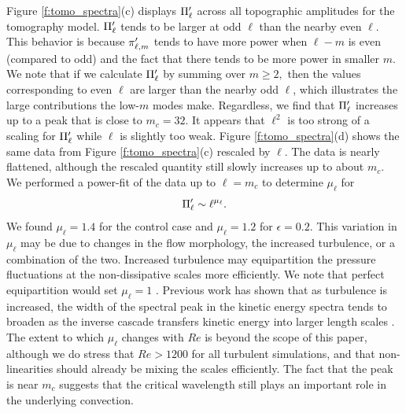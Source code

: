  Figure \ref{f:tomo_spectra}(c) displays $\Pi^{\prime}_{\ell}$ across all topographic amplitudes for the tomography model. $\Pi^{\prime}_{\ell}$ tends to be larger at odd $\ell$ than the nearby even $\ell$. This behavior is because $\pi^{\prime}_{\ell,m}$ tends to have more power when $\ell - m$ is even (compared to odd) and the fact that there tends to be more power in smaller $m$. 
We note that if we calculate  $\Pi^{\prime}_{\ell}$ by summing over $m\geq2,$ then the values corresponding to even $\ell$ are larger than the nearby odd $\ell$, which illustrates the large contributions the low-$m$ modes make. 
 Regardless, we find that $\Pi^{\prime}_{\ell}$ increases up to a peak that is close to $m_{c}=32$. It appears that  $\ell^{2}$ is too strong of a scaling for $\Pi^{\prime}_{\ell}$ while $\ell$ is slightly too weak. Figure \ref{f:tomo_spectra}(d) shows the same data from Figure \ref{f:tomo_spectra}(c) rescaled by $\ell.$ The data is nearly flattened, although the rescaled quantity still slowly increases up to about $m_{c}$. We performed a power-fit of the data up to $\ell = m_{c}$ to determine $\mu_{\ell}$ for
 \[\Pi^{\prime}_{\ell}\sim \ell^{\mu_{\ell}}.\]  
 We found $\mu_\ell={1.4}$ for the control case and $\mu_\ell={1.2}$ for $\epsilon  = 0.2.$
 This variation in $\mu_{\ell}$ may be due to changes in the flow morphology, the increased turbulence, or a combination of the two. Increased turbulence may equipartition the pressure fluctuations at the non-dissipative scales more efficiently. We note that perfect equipartition would set $\mu_{\ell}=1$ \citep{rK67}.
 Previous work has shown that as turbulence is increased, the width of the spectral peak in the kinetic energy spectra tends to broaden as the inverse cascade transfers kinetic energy into larger length scales \citep{cG19,cG25,sM21,tO23}.   
 The extent to which $\mu_{\ell}$ changes with $Re$ is beyond the scope of this paper, although we do stress that $Re>1200$ for all turbulent simulations, and that non-linearities should already be mixing the scales efficiently. The fact that the peak is near $m_{c}$ suggests that the critical wavelength still plays an important role in the underlying convection.  


